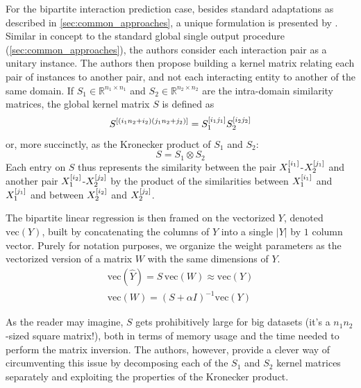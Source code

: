 For the bipartite interaction prediction case, besides standard adaptations as described in \autoref{sec:common_approaches}, a unique formulation is presented by \textcite{vanlaarhoven2011gaussian}. Similar in concept to the standard global single output procedure (\autoref{sec:common_approaches}), the authors consider each interaction pair as a unitary instance. The authors then propose building a kernel matrix relating each pair of instances to another pair, and not each interacting entity to another of the same domain. If $S_1 \in \mathbb{R}^{n_1 \times n_1}$ and $S_2 \in \mathbb{R}^{n_2 \times n_2}$ are the intra-domain similarity matrices, the global kernel matrix $S$ is defined as
%
\begin{equation}
    S^{[(i_1n_2 + i_2)(j_1 n_2 + j_2)]} = S_1^{[i_1j_1]} S_2^{[i_2j_2]}
\end{equation}
%
or, more succinctly, as the Kronecker product of $S_1$ and $S_2$:
%
\begin{equation}
    S = S_1 \otimes S_2
\end{equation}
%
Each entry on $S$ thus represents the similarity between the pair $X_1^{[i_1]}$-$X_2^{[j_1]}$ and another pair $X_1^{[i_2]}$-$X_2^{[j_2]}$ by the product of the similarities between $X_1^{[i_1]}$ and $X_1^{[j_1]}$ and between $X_2^{[i_2]}$ and $X_2^{[j_2]}$.

The bipartite linear regression is then framed on the vectorized $Y$, denoted $\text{vec}(Y)$, built by concatenating the columns of $Y$ into a single $|Y|$ by $1$ column vector.
Purely for notation purposes, we organize the weight parameters as the vectorized version of a matrix $W$ with the same dimensions of $Y$.
%
\begin{gather}
    \text{vec}(\hat Y) = S\,\text{vec}(W) \approx \text{vec}(Y)
    \\
    \text{vec}(W) = (S + \alpha I)^{-1} \text{vec}(Y)
\end{gather}

As the reader may imagine, $S$ gets prohibitively large for big datasets (it's a $n_1 n_2$-sized square matrix!), both in terms of memory usage and the time needed to perform the matrix inversion. The authors, however, provide a clever way of circumventing this issue by decomposing each of the $S_1$ and $S_2$ kernel matrices separately and exploiting the properties of the Kronecker product.

